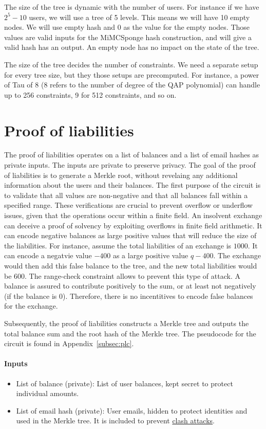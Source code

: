 The size of the tree is dynamic with the number of users. For instance if we have $2^5 - 10$ users, we will use a tree of 5 levels. This means we will
have 10 empty nodes. We will use empty hash and 0 as the value for the empty nodes. Those values are valid inputs for the MiMCSponge hash construction,
and will give a valid hash has an output. An empty node has no impact on the state of the tree.

The size of the tree decides the number of constraints. We need a separate setup for every tree size, but they those setups are precomputed. 
For instance, a power of Tau of 8 (8 refers to the number of degree of the QAP polynomial) can handle up to 256 constraints, 9 for 512 constraints, and so on.


\section{Proof of liabilities}
\label{subsec:pl}
The proof of liabilities operates on a list of balances and a list of email hashes as private inputs. The inputs are private to preserve privacy. 
The goal of the proof of liabilities is to generate a Merkle root, without revelaing any additional information about the users and their balances.
The first purpose of the circuit is to validate that all values are non-negative and that all balances fall within a specified range.
These verifications are crucial to prevent overflow or underflow issues, given that the operations occur within a finite field.
An insolvent exchange can deceive a proof of solvency by exploiting overflows in finite field arithmetic. 
It can encode negative balances as large positive values that will reduce the size of the liabilities. 
For instance, assume the total liabilities of an exchange is $1000$. It can encode a negatvie value $-400$ as a large positive value $q - 400$. 
The exchange would then add this false balance to the tree, and the new total liabilities would be $600$. 
The range-check constraint allows to prevent this type of attack. A balance is assured to contribute positively to the sum, or at least not negatively (if the balance is 0). 
Therefore, there is no incentitives to encode false balances for the exchange.

Subsequently, the proof of liabilities constructs a Merkle tree and outputs the total balance sum and the root hash of the Merkle tree.
The pseudocode for the circuit is found in Appendix~\ref{subsec:plc}.


\paragraph{Inputs}
\begin{itemize}
   \item List of balance (private): List of user balances, kept secret to protect individual amounts.
   \item List of email hash (private): User emails, hidden to protect identities and used in the Merkle tree. It is included to prevent \hyperref[subsec:ca]{clash attacks}.
   \end{itemize}


